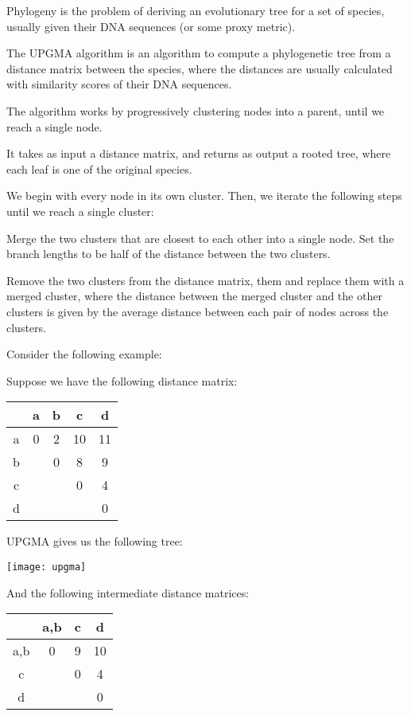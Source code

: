 



Phylogeny is the problem of deriving an evolutionary tree for a set of species, usually given their DNA sequences (or some proxy metric).

The UPGMA algorithm is an algorithm to compute a phylogenetic tree from a distance matrix between the species, where the distances are usually calculated with similarity scores of their DNA sequences.

The algorithm works by progressively clustering nodes into a parent, until we reach a single node.

It takes as input a distance matrix, and returns as output a rooted tree, where each leaf is one of the original species.

We begin with every node in its own cluster. Then, we iterate the following steps until we reach a single cluster:

Merge the two clusters that are closest to each other into a single node. Set the branch lengths to be half of the distance between the two clusters.

Remove the two clusters from the distance matrix, them and replace them with a merged cluster, where the distance between the merged cluster and the other clusters is given by the average distance between each pair of nodes across the clusters.

Consider the following example:

Suppose we have the following distance matrix:

\begin{tabular}{c|c|c|c|c}
  &a&b&c&d\\
  \hline
  a&0&2&10&11\\
  \hline
  b& &0&8&9\\
  \hline
  c& & &0&4\\
  \hline
  d& & & &0
\end{tabular}

UPGMA gives us the following tree:

\texttt{[image: upgma]}

And the following intermediate distance matrices:


\begin{tabular}{c|c|c|c}
  &a,b&c&d\\
  \hline
  a,b&0&9&10\\
  \hline
  c& &0&4\\
  \hline
  d& & &0
\end{tabular}

